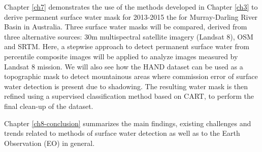 Chapter \ref{ch7} demonstrates the use of the methods developed in Chapter \ref{ch3} to derive permanent surface water mask for 2013-2015 the for Murray-Darling River Basin in Australia. Three surface water masks will be compared, derived from three alternative sources: 30m multispectral satellite imagery (Landsat 8), \gls{OSM} and \gls{SRTM}. Here, a stepwise approach to detect permanent surface water from percentile composite images will be applied to analyze images measured by Landsat 8 mission. We will also see how the \gls{HAND} dataset can be used as a topographic mask to detect mountainous areas where commission error of surface water detection is present due to shadowing. The resulting water mask is then refined using a supervised classification method based on \gls{CART}, to perform the final clean-up of the dataset.

Chapter \ref{ch8-conclusion} summarizes the main findings, existing challenges and trends related to methods of surface water detection as well as to the Earth Observation (EO) in general.
